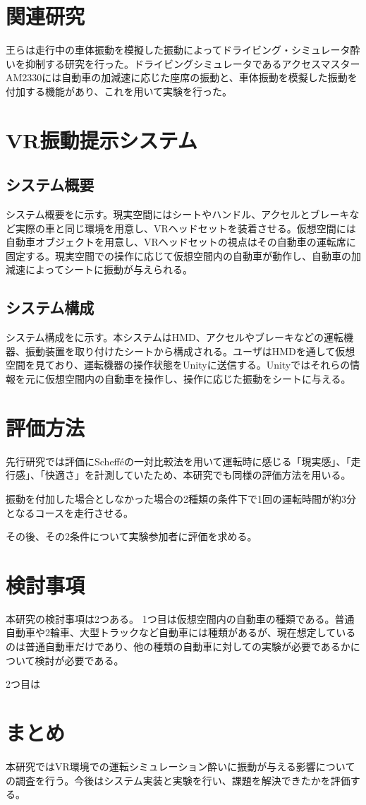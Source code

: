 \documentclass[uplatex]{jsarticle}
\begin{document}
\section{関連研究}
王らは走行中の車体振動を模擬した振動によってドライビング・シミュレータ酔いを抑制する研究を行った\cite{driving_vive}。ドライビングシミュレータであるアクセスマスターAM2330には自動車の加減速に応じた座席の振動と、車体振動を模擬した振動を付加する機能があり、これを用いて実験を行った。



\section{VR振動提示システム}
\subsection{システム概要}
システム概要をに示す。現実空間にはシートやハンドル、アクセルとブレーキなど実際の車と同じ環境を用意し、VRヘッドセットを装着させる。仮想空間には自動車オブジェクトを用意し、VRヘッドセットの視点はその自動車の運転席に固定する。現実空間での操作に応じて仮想空間内の自動車が動作し、自動車の加減速によってシートに振動が与えられる。

\subsection{システム構成}
システム構成をに示す。本システムはHMD、アクセルやブレーキなどの運転機器、振動装置を取り付けたシートから構成される。ユーザはHMDを通して仮想空間を見ており、運転機器の操作状態をUnityに送信する。Unityではそれらの情報を元に仮想空間内の自動車を操作し、操作に応じた振動をシートに与える。





\section{評価方法}
先行研究では評価にSchefféの一対比較法を用いて運転時に感じる「現実感」、「走行感」、「快適さ」を計測していたため、本研究でも同様の評価方法を用いる。

振動を付加した場合としなかった場合の2種類の条件下で1回の運転時間が約3分となるコースを走行させる。

その後、その2条件について実験参加者に評価を求める。

\section{検討事項}
本研究の検討事項は2つある。
1つ目は仮想空間内の自動車の種類である。普通自動車や2輪車、大型トラックなど自動車には種類があるが、現在想定しているのは普通自動車だけであり、他の種類の自動車に対しての実験が必要であるかについて検討が必要である。

2つ目は



\section{まとめ}
本研究ではVR環境での運転シミュレーション酔いに振動が与える影響についての調査を行う。今後はシステム実装と実験を行い、課題を解決できたかを評価する。


 
\end{document}
